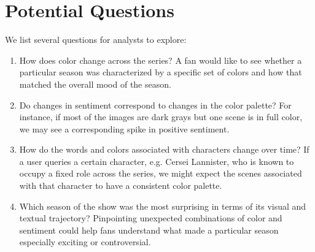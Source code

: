 \documentclass{article}
\begin{document}
\section*{Potential Questions}

We list several questions for analysts to explore:

\begin{enumerate}
    \item How does color change across the series? A fan would like to see whether a particular season was characterized by a specific set of colors and how that matched the overall mood of the season. 
    \item Do changes in sentiment correspond to changes in the color palette? For instance, if most of the images are dark grays but one scene is in full color, we may see a corresponding spike in positive sentiment.
    \item How do the words and colors associated with characters change over time? If a user queries a certain character, e.g. Cersei Lannister, who is known to occupy a fixed role across the series, we might expect the scenes associated with that character to have a consistent color palette.
    \item Which season of the show was the most surprising in terms of its visual and textual trajectory? Pinpointing unexpected combinations of color and sentiment could help fans understand what made a particular season especially exciting or controversial.
\end{enumerate}
\end{document}
